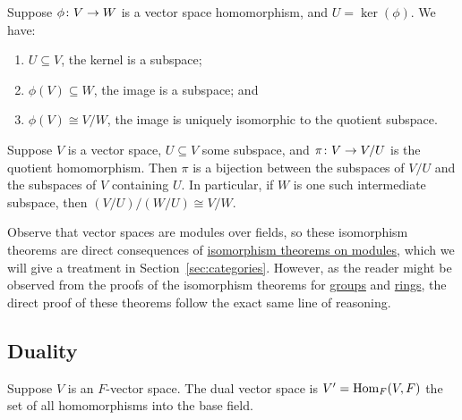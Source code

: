 \begin{theorem}\label{thm:iso-1-vsp}
    Suppose \(\phi\colon V\to W\) is a vector space homomorphism,
    and \(U = \ker(\phi)\).
    We have:
    \begin{enumerate}[label={(\alph*)}, itemsep=0mm]
        \item \(U \subseteq V\), the kernel is a subspace;
        \item \(\phi(V) \subseteq W\), the image is a subspace; and
        \item \(\phi(V) \cong V/W\), the image is uniquely isomorphic to the quotient subspace.
    \end{enumerate}
\end{theorem}
\begin{theorem}\label{thm:iso-3-vsp}\label{thm:iso-4-vsp}
    Suppose \(V\) is a vector space, \(U \subseteq V\) some subspace,
    and \(\pi\colon V\to V/U\) is the quotient homomorphism.
    Then \(\pi\) is a bijection between the subspaces of \(V/U\)
    and the subspaces of \(V\) containing \(U\).
    In particular, if \(W\) is one such intermediate subspace,
    then \((V/U)/(W/U) \cong V/W\).
\end{theorem}
\begin{remark}
    Observe that vector spaces are modules over fields,
    so these isomorphism theorems are direct consequences of
    \hyperref[thm:iso-1-module]{isomorphism theorems on modules},
    which we will give a treatment in Section~\ref{sec:categories}.
    However, as the reader might be observed
    from the proofs of the isomorphism theorems
    for \hyperref[thm:iso-1-group]{groups} and \hyperref[thm:iso-1-ring]{rings},
    the direct proof of these theorems follow the exact same line of reasoning.
\end{remark}


\subsection{Duality}

\begin{definition}
    Suppose \(V\) is an \(F\)-vector space.
    The dual vector space is \(V' = \operatorname{Hom}_F(V,F)\)
    the set of all homomorphisms into the base field.
\end{definition}

